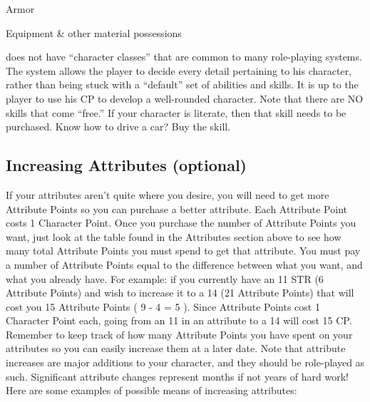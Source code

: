 \documentclass[twoside]{book}
\begin{document}
                       Armor 
                      
                    
                    
                       Equipment 
                        \& other material possessions 
                    
                  
                  
                
            \APATHY{}  does not have “character
              classes” that are common to many role-playing
              systems. The \APATHY{}  system allows the player to decide
              every detail pertaining to his character, rather than being
              stuck with a “default” set of abilities and
              skills. It is up to the player to use his CP to develop a
              well-rounded character. Note that there are NO skills that
              come “free.” If your character is literate,
              then that skill needs to be purchased. Know how to drive a
              car? Buy the skill.
            
\subsection{Increasing Attributes (optional)}
     If your attributes aren’t quite where you
               desire, you will need to get more Attribute Points so you
               can purchase a better attribute. Each Attribute Point
               costs 1 Character Point. Once you purchase the number of
               Attribute Points you want, just look at the table found in
               the Attributes section above to see how many total
               Attribute Points you must spend to get that attribute.
                You must pay a number of Attribute Points equal to
              the difference between what you want, and what you already
              have. For example: if you currently have an 11 STR (6
              Attribute Points) and wish to increase it to a 14 (21
              Attribute Points) that will cost you 15 Attribute Points (
               9  -  4  =
               5  ). Since Attribute Points cost
              1 Character Point each, going from an 11 in an attribute to
              a 14 will cost 15 CP.
             Remember to keep track of how many Attribute Points
               you have spent on your attributes so you can easily
               increase them at a later date.  Note that attribute increases are major additions to
               your character, and they should be role-played as such.
               Significant attribute changes represent months if not
               years of hard work! Here are some examples of possible
               means of increasing attributes:   
                
\end{document}
